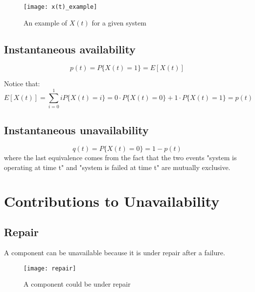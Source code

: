 \begin{figure}[!htp]
    \centering
    \texttt{[image: x(t)\_example]}
    \caption{An example of $X(t)$ for a given system}
\end{figure}

\subsection{Instantaneous availability}
\begin{equation*}
    p(t) = P\{X(t)=1\} = E[X(t)]
\end{equation*}

Notice that:
\begin{equation*}
    E[X(t)] = \sum_{i=0}^1 iP\{X(t)=i\} = 0\cdot P\{X(t)=0\} + 1\cdot P\{X(t)=1\} = p(t)
\end{equation*}

\subsection{Instantaneous unavailability}
\begin{equation*}
    q(t) = P\{X(t) = 0\} = 1 - p(t)
\end{equation*}
where the last equivalence comes from the fact that the two events "system is
operating at time t" and "system is failed at time t" are mutually exclusive.

\section{Contributions to Unavailability}
\subsection{Repair}
A component can be unavailable because it is under repair after a failure.
\begin{figure}[!htp]
    \centering
    \texttt{[image: repair]}
    \caption{A component could be under repair}
\end{figure}

